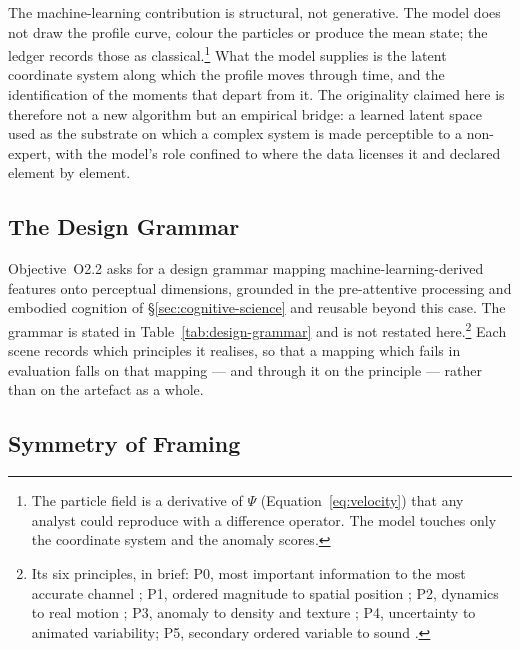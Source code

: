The machine-learning contribution is structural, not generative. The model does not draw the profile curve, colour the particles or produce the mean state; the ledger records those as classical.\footnote{The particle field is a derivative of $\Psi$ (Equation~\ref{eq:velocity}) that any analyst could reproduce with a difference operator. The model touches only the coordinate system and the anomaly scores.} What the model supplies is the latent coordinate system along which the profile moves through time, and the identification of the moments that depart from it. The originality claimed here is therefore not a new algorithm but an empirical bridge: a learned latent space used as the substrate on which a complex system is made perceptible to a non-expert, with the model's role confined to where the data licenses it and declared element by element.
 
\subsection{The Design Grammar}
\label{sec:grammar}
 
Objective~O2.2 asks for a design grammar mapping machine-learning-derived features onto perceptual dimensions, grounded in the pre-attentive processing and embodied cognition of \S\ref{sec:cognitive-science} and reusable beyond this case. The grammar is stated in Table~\ref{tab:design-grammar} and is not restated here.\footnote{Its six principles, in brief: P0, most important information to the most accurate channel \parencite{munzner2014,bertin1983}; P1, ordered magnitude to spatial position \parencite{clevelandmcgill1984}; P2, dynamics to real motion \parencite{sterman2008,cronin2009}; P3, anomaly to density and texture \parencite{bertin1983,ware2021}; P4, uncertainty to animated variability; P5, secondary ordered variable to sound \parencite{hermann2011}.} Each scene records which principles it realises, so that a mapping which fails in evaluation falls on that mapping --- and through it on the principle --- rather than on the artefact as a whole.
 
\subsection{Symmetry of Framing}
\label{subsec:symmetry}
 
